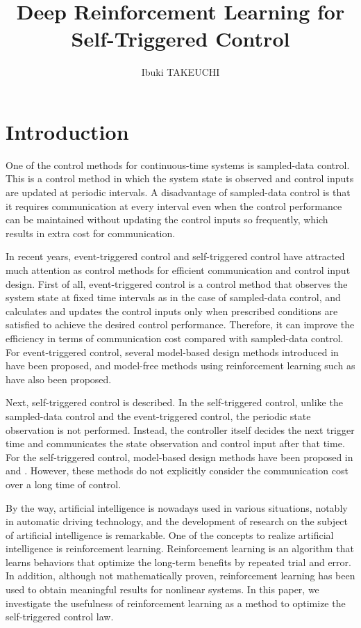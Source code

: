 \documentclass[english, dvipdfmx]{ampmt}             %
\title[Deep Reinforcement Learning for Self-Triggered Control]
      {Deep Reinforcement Learning for Self-Triggered Control}
\author{Ibuki TAKEUCHI}
\begin{document}
\ifoutputbody
\makeinsidecover                %
\makeabstract                   %
\maketoc                        %
\setcounter{page}{1}
\section{Introduction}
One of the control methods for continuous-time systems is sampled-data control. This is a control method in which the system state is observed and control inputs are updated at periodic intervals. A  disadvantage of sampled-data control is that it requires communication at every interval even when the control performance can be maintained without updating the control inputs so frequently, which results in extra cost for communication.\par
In recent years, event-triggered control and self-triggered control have attracted much attention as control methods for efficient communication and control input design. First of all, event-triggered control is a control method that observes the system state at fixed time intervals as in the case of sampled-data control, and calculates and updates the control inputs only when prescribed conditions are satisfied to achieve the desired control performance. Therefore, it can improve the efficiency in terms of communication cost compared with sampled-data control. For event-triggered control, several model-based design methods introduced in \cite{ETC_intro} have been proposed, and model-free methods using reinforcement learning such as \cite{ETC} have also been proposed.\par
Next, self-triggered control is described. In the self-triggered control, unlike the sampled-data control and the event-triggered control, the periodic state observation is not performed. Instead, the controller itself decides the next trigger time and communicates the state observation and control input after that time. For the self-triggered control, model-based design methods have been proposed in \cite{STC} and \cite{ECBF}. However, these methods do not explicitly consider the communication cost over a long time of control.\par
By the way, artificial intelligence is nowadays used in various situations, notably in automatic driving technology, and the development of research on the subject of artificial intelligence is remarkable. One of the concepts to realize artificial intelligence is reinforcement learning. Reinforcement learning is an algorithm that learns behaviors that optimize the long-term benefits by repeated trial and error. In addition, although not mathematically proven, reinforcement learning has been used to obtain meaningful results for nonlinear systems. In this paper, we investigate the usefulness of reinforcement learning as a method to optimize the self-triggered control law. \par
\end{document}
